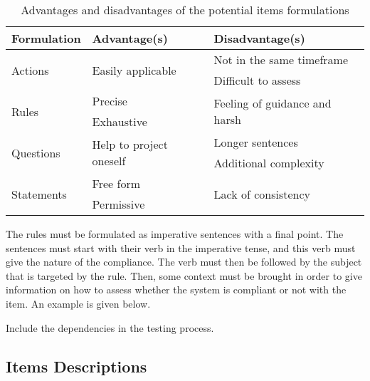 \begin{table}[ht]
    \begin{center}
        \begin{tabular}{l|ll}
            \toprule[0.8mm]
            \textbf{Formulation} & \textbf{Advantage(s)} & \textbf{Disadvantage(s)} \\
            \midrule[0.8mm]
            \multirow{2}{*}{Actions} & \multirow{2}{*}{Easily applicable} & Not in the same timeframe \\
            & & Difficult to assess \\
            \midrule
            \multirow{2}{*}{Rules} & Precise & \multirow{2}{*}{Feeling of guidance and harsh} \\
            & Exhaustive & \\
            \midrule
            \multirow{2}{*}{Questions} & \multirow{2}{*}{Help to project oneself} & Longer sentences \\
            & & Additional complexity \\
            \midrule
            \multirow{2}{*}{Statements} & Free form & \multirow{2}{*}{Lack of consistency} \\
            & Permissive & \\
            \bottomrule[0.8mm]
        \end{tabular}
    \end{center}
    \caption{Advantages and disadvantages of the potential items formulations}
    \label{table:proposal_content_formulation_comparison}
\end{table}

The rules must be formulated as imperative sentences with a final point. The sentences must start with their verb in the imperative tense, and this verb must give the nature of the compliance. The verb must then be followed by the subject that is targeted by the rule. Then, some context must be brought in order to give information on how to assess whether the system is compliant or not with the item. An example is given below.

\begin{center}
	Include the dependencies in the testing process.
\end{center}

\subsection{Items Descriptions}
\label{subsec:proposal_content_descriptions}

